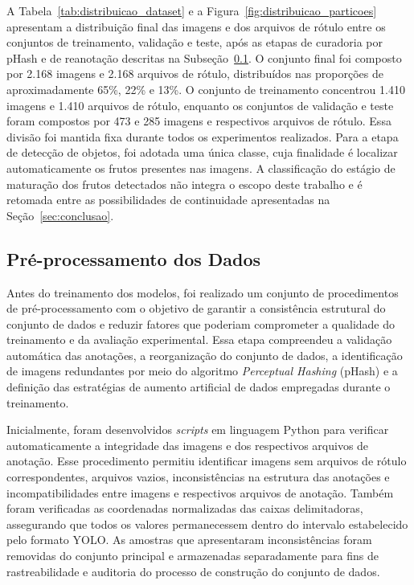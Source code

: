 \documentclass[artigo,times,capa]{iftex2024}
\begin{document}
A Tabela~\ref{tab:distribuicao_dataset} e a Figura~\ref{fig:distribuicao_particoes}
apresentam a distribuição final das imagens e dos arquivos de rótulo entre os
conjuntos de treinamento, validação e teste, após as etapas de curadoria por
pHash e de reanotação descritas na Subseção~\ref{sec:preprocessamento}. O
conjunto final foi composto por 2.168 imagens e 2.168 arquivos de rótulo,
distribuídos nas proporções de aproximadamente 65\%, 22\% e 13\%. O conjunto de
treinamento concentrou 1.410 imagens e 1.410 arquivos de rótulo, enquanto os
conjuntos de validação e teste foram compostos por 473 e 285 imagens e
respectivos arquivos de rótulo. Essa divisão foi mantida fixa durante todos os
experimentos realizados. Para a etapa de detecção de objetos, foi adotada uma
única classe, cuja finalidade é localizar automaticamente os frutos
presentes nas imagens. A classificação do estágio de maturação dos frutos
detectados não integra o escopo deste trabalho e é retomada entre as possibilidades
de continuidade apresentadas na Seção~\ref{sec:conclusao}.

\subsection{Pré-processamento dos Dados}
\label{sec:preprocessamento}

Antes do treinamento dos modelos, foi realizado um conjunto de procedimentos de pré-processamento com o objetivo de garantir a consistência estrutural do conjunto de dados e reduzir fatores que poderiam comprometer a qualidade do treinamento e da avaliação experimental. Essa etapa compreendeu a validação automática das anotações, a reorganização do conjunto de dados, a identificação de imagens redundantes por meio do algoritmo \textit{Perceptual Hashing} (pHash) e a definição das estratégias de aumento artificial de dados empregadas durante o treinamento.

Inicialmente, foram desenvolvidos \textit{scripts} em linguagem Python para verificar automaticamente a integridade das imagens e dos respectivos arquivos de anotação. Esse procedimento permitiu identificar imagens sem arquivos de rótulo correspondentes, arquivos vazios, inconsistências na estrutura das anotações e incompatibilidades entre imagens e respectivos arquivos de anotação. Também foram verificadas as coordenadas normalizadas das caixas delimitadoras, assegurando que todos os valores permanecessem dentro do intervalo estabelecido pelo formato YOLO. As amostras que apresentaram inconsistências foram removidas do conjunto principal e armazenadas separadamente para fins de rastreabilidade e auditoria do processo de construção do conjunto de dados.
\end{document}
